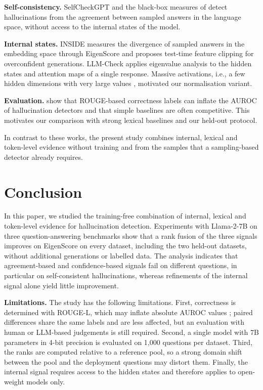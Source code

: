\documentclass[10pt]{article}
\begin{document}
\textbf{Self-consistency.} SelfCheckGPT \citep{manakul2023} and the black-box measures of \citet{lin2023generating} detect hallucinations from the agreement between sampled answers in the language space, without access to the internal states of the model.

\textbf{Internal states.} INSIDE \citep{chen2024inside} measures the divergence of sampled answers in the embedding space through EigenScore and proposes test-time feature clipping for overconfident generations. LLM-Check \citep{sriramanan2024} applies eigenvalue analysis to the hidden states and attention maps of a single response. Massive activations, i.e., a few hidden dimensions with very large values \citep{sun2024massive}, motivated our normalisation variant.

\textbf{Evaluation.} \citet{janiak2025} show that ROUGE-based correctness labels can inflate the AUROC of hallucination detectors and that simple baselines are often competitive. This motivates our comparison with strong lexical baselines and our held-out protocol.

In contrast to these works, the present study combines internal, lexical and token-level evidence without training and from the samples that a sampling-based detector already requires.

\section{Conclusion}\label{sec:conclusion}
In this paper, we studied the training-free combination of internal, lexical and token-level evidence for hallucination detection. Experiments with Llama-2-7B on three question-answering benchmarks show that a rank fusion of the three signals improves on EigenScore on every dataset, including the two held-out datasets, without additional generations or labelled data. The analysis indicates that agreement-based and confidence-based signals fail on different questions, in particular on self-consistent hallucinations, whereas refinements of the internal signal alone yield little improvement.

\textbf{Limitations.} The study has the following limitations. First, correctness is determined with ROUGE-L, which may inflate absolute AUROC values \citep{janiak2025}; paired differences share the same labels and are less affected, but an evaluation with human or LLM-based judgements is still required. Second, a single model with 7B parameters in 4-bit precision is evaluated on 1,000 questions per dataset. Third, the ranks are computed relative to a reference pool, so a strong domain shift between the pool and the deployment questions may distort them. Finally, the internal signal requires access to the hidden states and therefore applies to open-weight models only.
\end{document}
